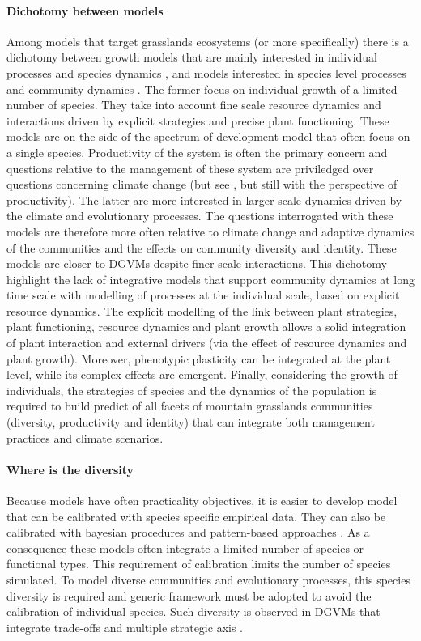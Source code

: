\paragraph{Dichotomy between models}
Among models that target grasslands ecosystems (or more specifically) there is a dichotomy between growth models that are mainly interested in individual processes and species dynamics \cite{soussana_gemini:_2012, taubert_modelling_2014, lohier_analyse_2016}, and models interested in species level processes and community dynamics \parencite{boulangeat_fate-dh_2014, cotto_dynamic_2017}. The former focus on individual growth of a limited number of species. They take into account fine scale resource dynamics and interactions driven by explicit strategies and precise plant functioning. These models are on the side of the spectrum of development model that often focus on a single species. Productivity of the system is often the primary concern and questions relative to the management of these system are priviledged over questions concerning climate change (but see \cite{rodriguez_lingra-cc:_1999}, but still with the perspective of productivity). The latter are more interested in larger scale dynamics driven by the climate and evolutionary processes. The questions interrogated with these models are therefore more often relative to climate change and adaptive dynamics of the communities and the effects on community diversity and identity. These models are closer to DGVMs despite finer scale interactions. This dichotomy highlight the lack of integrative models that support community dynamics at long time scale with modelling of processes at the individual scale, based on explicit resource dynamics. The explicit modelling of the link between plant strategies, plant functioning, resource dynamics and plant growth allows a solid integration of plant interaction and external drivers (via the effect of resource dynamics and plant growth). Moreover, phenotypic plasticity can be integrated at the plant level, while its complex effects are emergent. Finally, considering the growth of individuals, the strategies of species and the dynamics of the population is required to build predict of all facets of mountain grasslands communities (diversity, productivity and identity) that can integrate both management practices and climate scenarios.

\paragraph{Where is the diversity}
Because models have often practicality objectives, it is easier to develop model that can be calibrated with species specific empirical data. They can also be calibrated with bayesian procedures and pattern-based approaches \cite{hartig_statistical_2011}. As a consequence these models often integrate a limited number of species or functional types. This requirement of calibration limits the number of species simulated. To model diverse communities and evolutionary processes, this species diversity is required and generic framework must be adopted to avoid the calibration of individual species. Such diversity is observed in DGVMs that integrate trade-offs and multiple strategic axis \parencite{kleidon_global_20000, pavlick_jena_2013}.

